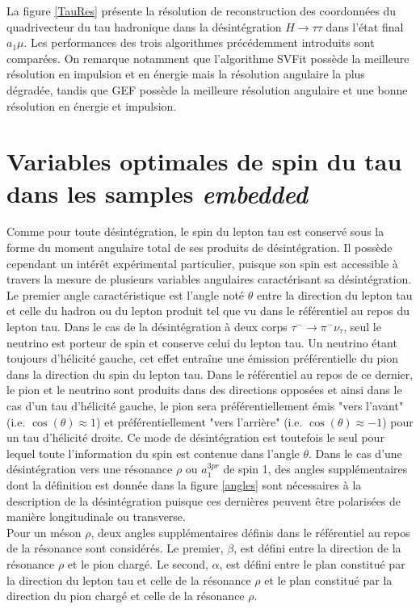 La figure \ref{TauRes} présente la résolution de reconstruction des coordonnées du quadrivecteur du tau hadronique dans la désintégration $H\rightarrow\tau\tau$ dans l'état final $a_1\mu$. Les performances des trois algorithmes précédemment introduits sont comparées. On remarque notamment que l'algorithme SVFit possède la meilleure résolution en impulsion et en énergie mais la résolution angulaire la plus dégradée, tandis que GEF possède la meilleure résolution angulaire et une bonne résolution en énergie et impulsion.

\section{Variables optimales de spin du tau dans les samples \textit{embedded}}
\label{optvar}

Comme pour toute désintégration, le spin du lepton tau est conservé sous la forme du moment angulaire total de ses produits de désintégration. Il possède cependant un intérêt expérimental particulier, puisque son spin est accessible à travers la mesure de plusieurs variables angulaires caractérisant sa désintégration. Le premier angle caractéristique est l'angle noté $\theta$ entre la direction du lepton tau et celle du hadron ou du lepton produit tel que vu dans le référentiel au repos du lepton tau. Dans le cas de la désintégration à deux corps $\tau^-\rightarrow\pi^-\nu_{\tau}$, seul le neutrino est porteur de spin et conserve celui du lepton tau. Un neutrino étant toujours d'hélicité gauche, cet effet entraîne une émission préférentielle du pion dans la direction du spin du lepton tau. Dans le référentiel au repos de ce dernier, le pion et le neutrino sont produits dans des directions opposées et ainsi dans le cas d'un tau d'hélicité gauche, le pion sera préférentiellement émis "vers l'avant" (i.e. $\cos(\theta)\approx 1$) et préférentiellement "vers l'arrière" (i.e. $\cos(\theta)\approx -1$) pour un tau d'hélicité droite. Ce mode de désintégration est toutefois le seul pour lequel toute l'information du spin est contenue dans l'angle $\theta$. Dans le cas d'une désintégration vers une résonance $\rho$ ou $a_1^{3pr}$ de spin 1, des angles supplémentaires dont la définition est donnée dans la figure \ref{angles} sont nécessaires à la description de la désintégration puisque ces dernières peuvent être polarisées de manière longitudinale ou transverse. \\

Pour un méson $\rho$, deux angles supplémentaires définis dans le référentiel au repos de la résonance sont considérés. Le premier, $\beta$, est défini entre la direction de la résonance $\rho$ et le pion chargé. Le second, $\alpha$, est défini entre le plan constitué par la direction du lepton tau et celle de la résonance $\rho$ et le plan constitué par la direction du pion chargé et celle de la résonance $\rho$. \\

